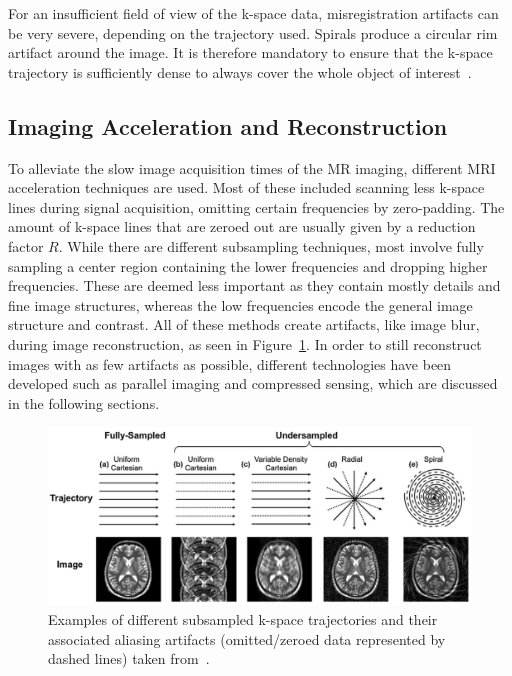 For an insufficient field of view of the k-space data, misregistration artifacts can be very severe, depending on the trajectory used. Spirals produce a circular rim artifact around the image. It is therefore mandatory to ensure that the k-space trajectory is sufficiently dense to always cover the whole object of interest~\cite{SamplingStrategies}. 

\subsection{Imaging Acceleration and Reconstruction} \label{SubSec:ImagingAccelerationReconstruction}
To alleviate the slow image acquisition times of the MR imaging, different MRI acceleration techniques are used. Most of these included scanning less k-space lines during signal acquisition, omitting certain frequencies by zero-padding.
The amount of k-space lines that are zeroed out are usually given by a reduction factor $R$. While there are different subsampling techniques, most involve fully sampling a center region containing the lower frequencies and dropping higher frequencies. These are deemed less important as they contain mostly details and fine image structures, whereas the low frequencies encode the general image structure and contrast. All of these methods create artifacts, like image blur, during image reconstruction, as seen in Figure~\ref{fig:ExamplesSubsampling}. In order to still reconstruct images with as few artifacts as possible, different technologies have been developed such as parallel imaging and compressed sensing, which are discussed in the following sections.

\begin{figure}[htpb]
	\centering
	\graphicspath{{images/}{\main/images/}}
	\includegraphics[width=\linewidth]{ExamplesSubsampling.png} 
	\caption{Examples of different subsampled k-space trajectories and their associated aliasing artifacts (omitted/zeroed data represented by dashed lines) taken from~\cite{AdvancesPI}.}
	\label{fig:ExamplesSubsampling}
\end{figure}

